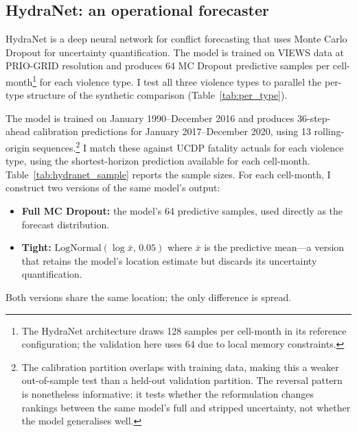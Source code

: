 \subsection{HydraNet: an operational forecaster}

HydraNet \citep{VonDerMaase2025hydranet} is a deep neural network for conflict forecasting that uses Monte Carlo Dropout \citep{gal2016dropout} for uncertainty quantification. The model is trained on VIEWS data at PRIO-GRID resolution and produces 64 MC Dropout predictive samples per cell-month\footnote{The HydraNet architecture draws 128 samples per cell-month in its reference configuration; the validation here uses 64 due to local memory constraints.} for each violence type. I test all three violence types to parallel the per-type structure of the synthetic comparison (Table~\ref{tab:per_type}).

The model is trained on January 1990--December 2016 and produces 36-step-ahead calibration predictions for January 2017--December 2020, using 13 rolling-origin sequences.\footnote{The calibration partition overlaps with training data, making this a weaker out-of-sample test than a held-out validation partition. The reversal pattern is nonetheless informative: it tests whether the reformulation changes rankings between the same model's full and stripped uncertainty, not whether the model generalises well.} I match these against UCDP fatality actuals for each violence type, using the shortest-horizon prediction available for each cell-month. Table~\ref{tab:hydranet_sample} reports the sample sizes. For each cell-month, I construct two versions of the same model's output:
\begin{itemize}
    \item \textbf{Full MC Dropout:} the model's 64 predictive samples, used directly as the forecast distribution.
    \item \textbf{Tight:} $\text{LogNormal}(\log \bar{x}, \, 0.05)$ where $\bar{x}$ is the predictive mean---a version that retains the model's location estimate but discards its uncertainty quantification.
\end{itemize}
Both versions share the same location; the only difference is spread.

